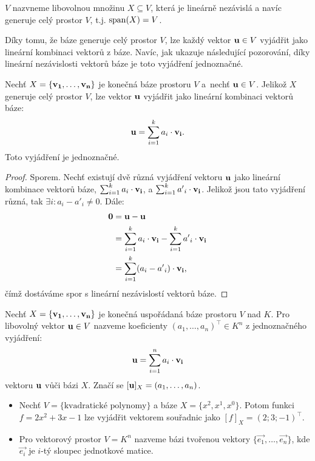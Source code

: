 \begin{definition}
     $V$ nazvneme libovolnou množinu $X \subseteq V$,
    která je lineárně nezávislá a navíc generuje celý prostor $V$, t.j. 
    $\mathop{\mathrm{span}}(X) = V$.
\end{definition}

\begin{remark}
    Díky tomu, že báze generuje celý prostor $V$, lze
    každý vektor $\mathbf{u} \in V$ vyjádřit jako lineární kombinaci vektorů z báze.
    Navíc, jak ukazuje následující pozorování, díky lineární nezávislosti
    vektorů báze je toto vyjádření jednoznačné.
\end{remark}

\begin{observation}
    Nechť $X = \{\mathbf{v_1}, \dots, \mathbf{v_n}\}$ je konečná báze prostoru $V$ 
    a~nechť $\mathbf{u} \in V$. Jelikož $X$ generuje celý prostor $V$, lze
    vektor $\mathbf{u}$ vyjádřit jako lineární kombinaci vektorů báze: 
    $$\mathbf{u} = \sum_{i=1}^k a_i \cdot \mathbf{v_i}.$$ Toto vyjádření je jednoznačné.
\end{observation}

\begin{proof}
    Sporem. Nechť existují dvě různá vyjádření vektoru $\mathbf{u}$ jako lineární
    kombinace vektorů báze, $\sum_{i=1}^k a_i \cdot \mathbf{v_i}$, a 
    $\sum_{i=1}^k {a'}_i \cdot \mathbf{v_i}$. Jelikož jsou tato vyjádření různá, 
    tak $\exists i: a_i - {a'}_i \neq 0$. Dále:
    \begin{align*}
        \mathbf{0} &= \mathbf{u} - \mathbf{u}\\
               &= \sum_{i=1}^k {a}_i \cdot \mathbf{v_i} 
                - \sum_{i=1}^k {a'}_i \cdot \mathbf{v_i}\\
               &= \sum_{i=1}^k ({a}_i - {a'}_i) \cdot \mathbf{v_i},
    \end{align*}
    čímž dostáváme spor s lineární nezávislostí vektorů báze.
\end{proof}

\begin{definition}
    Nechť $X = \{\mathbf{v_1}, \dots, \mathbf{v_n}\}$ je konečná uspořádaná báze 
    prostoru $V$ nad $K$. Pro libovolný vektor $\mathbf{u} \in V$ nazveme 
    koeficienty $(a_1, \dots, a_n)^\top \in K^n$ z jednoznačného 
    vyjádření: $$ \mathbf{u} = \sum_{i=1}^n a_i \cdot \mathbf{v_i}$$
     vektoru $\mathbf{u}$ vůči bázi $X$. Značí se
    $[\mathbf{u}]_X = (a_1, \dots, a_n)$.
\end{definition}

\begin{remark}
    \leavevmode
    \begin{itemize}
        \item Nechť $V = \{\text{kvadratické polynomy}\}$ a báze 
            $X = \{x^2, x^1, x^0\}.$ Potom funkci $f = 2x^2 + 3x - 1$ lze 
            vyjádřit vektorem souřadnic jako $[f]_X = (2; 3; -1)^\top$.
        \item Pro vektorový prostor $V = K^n$ nazveme  bázi tvořenou vektory $\{\vec{e_1}, \dots, \vec{e_n}\}$, 
            kde $\vec{e_i}$ je $i$-tý sloupec jednotkové matice.
    \end{itemize}
\end{remark}

